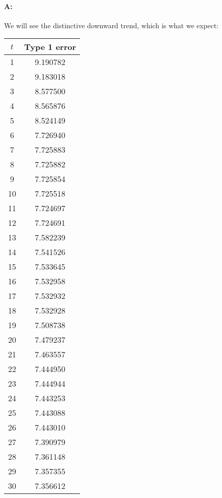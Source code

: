 \documentclass[11pt]{article}
\begin{document}
\paragraph{A:} We will see the distinctive downward trend, which is what we expect:

\begin{tabular}{ | c | c | }
  \hline
  $t$ & Type 1 error \\
  \hline
  \hline
  1 & 9.190782 \\ 
  \hline
  2 & 9.183018 \\ 
  \hline
  3 & 8.577500 \\ 
  \hline
  4 & 8.565876 \\ 
  \hline
  5 & 8.524149 \\ 
  \hline
  6 & 7.726940 \\ 
  \hline
  7 & 7.725883 \\ 
  \hline
  8 & 7.725882 \\ 
  \hline
  9 & 7.725854 \\ 
  \hline
  10 & 7.725518 \\ 
  \hline
  11 & 7.724697 \\ 
  \hline
  12 & 7.724691 \\ 
  \hline
  13 & 7.582239 \\ 
  \hline
  14 & 7.541526 \\ 
  \hline
  15 & 7.533645 \\ 
  \hline
  16 & 7.532958 \\ 
  \hline
  17 & 7.532932 \\ 
  \hline
  18 & 7.532928 \\ 
  \hline
  19 & 7.508738 \\ 
  \hline
  20 & 7.479237 \\ 
  \hline
  21 & 7.463557 \\ 
  \hline
  22 & 7.444950 \\ 
  \hline
  23 & 7.444944 \\ 
  \hline
  24 & 7.443253 \\ 
  \hline
  25 & 7.443088 \\ 
  \hline
  26 & 7.443010 \\ 
  \hline
  27 & 7.390979 \\ 
  \hline
  28 & 7.361148 \\ 
  \hline
  29 & 7.357355 \\ 
  \hline
  30 & 7.356612 \\ 
  \hline
\end{tabular}
\end{document}
